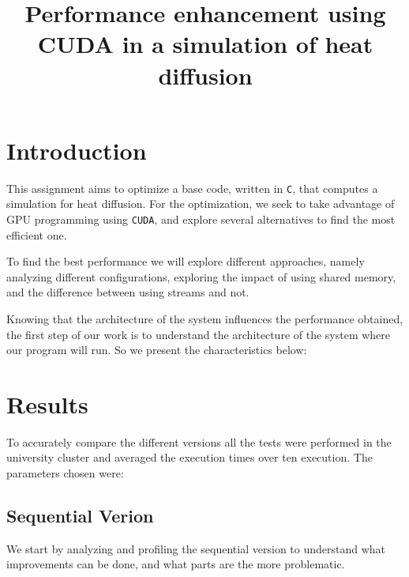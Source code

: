 \documentclass[conference]{IEEEtran}
\begin{document}
\title{Performance enhancement using CUDA in a simulation of heat diffusion}

\author{
\and
{}
}

\maketitle



\section{Introduction}
This assignment aims to optimize a base code, written in \texttt{C}, that computes a simulation for heat diffusion. For the optimization, we seek to take advantage of GPU programming using \texttt{CUDA}, and explore several alternatives to find the most efficient one.

To find the best performance we will explore different approaches, namely analyzing different configurations, exploring the impact of using shared memory, and the difference between using streams and not.

Knowing that the architecture of the system influences the performance obtained, the first step of our work is to understand the architecture of the system where our program will run. So we present the characteristics below:


\section{Results}
To accurately compare the different versions all the tests were performed in the university cluster and averaged the execution times over ten execution. The parameters chosen were:



\subsection{Sequential Verion}
We start by analyzing and profiling the sequential version to understand what improvements can be done, and what parts are the more problematic.
\end{document}
